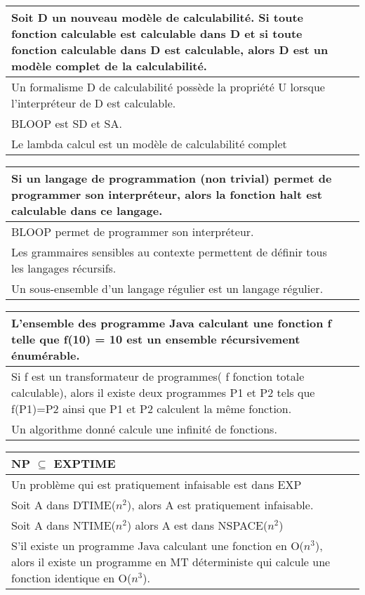 \documentclass[12pt, a4paper]{article}
\begin{document}
\begin{tabular}{p{13cm}|l}
Soit D un nouveau modèle de calculabilité. Si toute fonction calculable est calculable dans D et si toute fonction calculable dans D est calculable, alors D est un modèle complet de la calculabilité. & \\ \hline
Un formalisme D de calculabilité possède la propriété U lorsque l'interpréteur de D est calculable. & \\ \hline
BLOOP est SD et SA. & \\ \hline
Le lambda calcul est un modèle de calculabilité complet & \\ \hline
\end{tabular}
\bigskip

\begin{tabular}{p{13cm}|l}
Si un langage de programmation (non trivial) permet de programmer son interpréteur, alors la fonction halt est calculable dans ce langage. & \\ \hline
BLOOP permet de programmer son interpréteur. & \\ \hline
Les grammaires sensibles au contexte permettent de définir tous les langages récursifs. & \\ \hline
Un sous-ensemble d'un langage régulier est un langage régulier. & \\ \hline
\end{tabular}
\bigskip

\begin{tabular}{p{13cm}|l}
L'ensemble des programme Java calculant une fonction f telle que f(10) = 10 est un ensemble récursivement énumérable. & \\ \hline
Si f est un transformateur de programmes( f fonction totale calculable), alors il existe deux programmes P1 et P2 tels que f(P1)=P2 ainsi que P1 et P2 calculent la même fonction. & \\ \hline
Un algorithme donné calcule une infinité de fonctions. & \\ \hline
\end{tabular}
\bigskip

\begin{tabular}{p{13cm}|l}
NP $\subseteq$ EXPTIME & \\ \hline
Un problème qui est pratiquement infaisable est dans EXP & \\ \hline
Soit A dans DTIME($n^2$), alors A est pratiquement infaisable. & \\ \hline
Soit A dans NTIME($n^2$) alors A est dans NSPACE($n^2$) & \\ \hline
S'il existe un programme Java calculant une fonction en O($n^3$), alors il existe un programme en MT déterministe qui calcule une fonction identique en O($n^3$).
\end{tabular}
\bigskip
\end{document}
